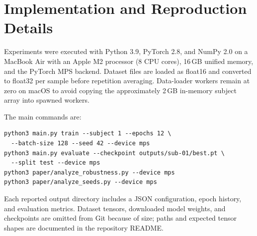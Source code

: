 \documentclass[10pt]{article}
\begin{document}
\appendix
\section{Implementation and Reproduction Details}

Experiments were executed with Python 3.9, PyTorch 2.8, and NumPy 2.0 on a
MacBook Air with an Apple M2 processor (8 CPU cores), 16\,GB unified memory,
and the PyTorch MPS backend. Dataset files are loaded as float16 and converted
to float32 per sample before repetition averaging. Data-loader workers remain
at zero on macOS to avoid copying the approximately 2\,GB in-memory subject
array into spawned workers.

The main commands are:
\begin{verbatim}
python3 main.py train --subject 1 --epochs 12 \
  --batch-size 128 --seed 42 --device mps
python3 main.py evaluate --checkpoint outputs/sub-01/best.pt \
  --split test --device mps
python3 paper/analyze_robustness.py --device mps
python3 paper/analyze_seeds.py --device mps
\end{verbatim}

Each reported output directory includes a JSON configuration, epoch history,
and evaluation metrics. Dataset tensors, downloaded model weights, and
checkpoints are omitted from Git because of size; paths and expected tensor
shapes are documented in the repository README.


\end{document}

